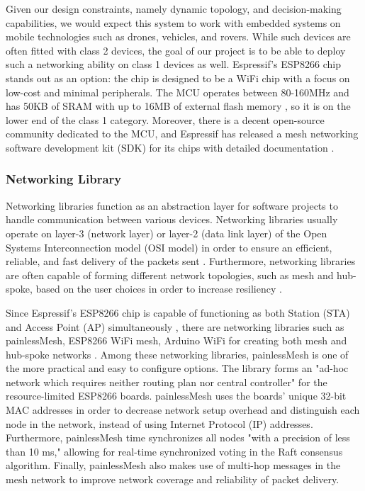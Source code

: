 Given our design constraints, namely dynamic topology, and decision-making capabilities, we would expect this system to work with embedded systems on mobile technologies such as drones, vehicles, and rovers. While such devices are often fitted with class 2 devices, the goal of our project is to be able to deploy such a networking ability on class 1 devices as well. Espressif's ESP8266 chip stands out as an option: the chip is designed to be a WiFi chip with a focus on low-cost and minimal peripherals. The MCU operates between 80-160MHz and has 50KB of SRAM with up to 16MB of external flash memory \cite{espressif:esp8266}, so it is on the lower end of the class 1 category. Moreover, there is a decent open-source community dedicated to the MCU, and Espressif has released a mesh networking software development kit (SDK) for its chips with detailed documentation \cite{esp-mesh-docs}. 

\subsubsection{Networking Library}
Networking libraries function as an abstraction layer for software projects to handle communication between various devices. Networking libraries usually operate on layer-3 (network layer) or layer-2 (data link layer) of the Open Systems Interconnection model (OSI model) in order to ensure an efficient, reliable, and fast delivery of the packets sent \cite{perlman1988choosing}. Furthermore, networking libraries are often capable of forming different network topologies, such as mesh and hub-spoke, based on the user choices in order to increase resiliency \cite{riggio2008hardware}.

Since Espressif's ESP8266 chip is capable of functioning as both Station (STA) and Access Point (AP) simultaneously \cite{espressif:esp8266}, there are networking libraries such as painlessMesh, ESP8266 WiFi mesh, Arduino WiFi for creating both mesh and hub-spoke networks \cite{yoppyperformance}. Among these networking libraries, painlessMesh is one of the more practical and easy to configure options. The library forms an "ad-hoc network which requires neither routing plan nor central controller"  \cite{yoppyperformance} for the resource-limited ESP8266 boards. painlessMesh uses the boards' unique 32-bit MAC addresses \cite{painlessMesh} in order to decrease network setup overhead and distinguish each node in the network, instead of using Internet Protocol (IP) addresses. Furthermore, painlessMesh time synchronizes all nodes "with a precision of less than 10 ms," \cite{yoppyperformance} allowing for real-time synchronized voting in the Raft consensus algorithm. Finally, painlessMesh also makes use of multi-hop messages in the mesh network \cite{painlessMesh} to improve network coverage and reliability of packet delivery. 


